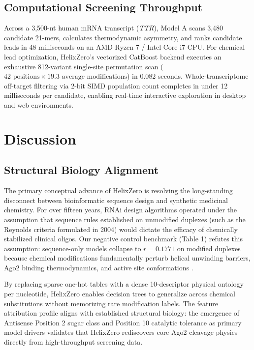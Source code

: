 \documentclass[twocolumn]{article}
\begin{document}
\subsection{Computational Screening Throughput}
Across a 3,500-nt human mRNA transcript (\textit{TTR}), Model A scans 3,480 candidate 21-mers, calculates thermodynamic asymmetry, and ranks candidate leads in 48 milliseconds on an AMD Ryzen 7 / Intel Core i7 CPU. For chemical lead optimization, HelixZero's vectorized CatBoost backend executes an exhaustive 812-variant single-site permutation scan ($42 \text{ positions} \times 19.3 \text{ average modifications}$) in 0.082 seconds. Whole-transcriptome off-target filtering via 2-bit SIMD population count completes in under 12 milliseconds per candidate, enabling real-time interactive exploration in desktop and web environments.

\section{Discussion}

\subsection{Structural Biology Alignment}
The primary conceptual advance of HelixZero is resolving the long-standing disconnect between bioinformatic sequence design and synthetic medicinal chemistry. For over fifteen years, RNAi design algorithms operated under the assumption that sequence rules established on unmodified duplexes (such as the Reynolds criteria formulated in 2004) would dictate the efficacy of chemically stabilized clinical oligos. Our negative control benchmark (Table 1) refutes this assumption: sequence-only models collapse to $r = 0.1771$ on modified duplexes because chemical modifications fundamentally perturb helical unwinding barriers, Ago2 binding thermodynamics, and active site conformations \cite{uppuladinne2019jbsd}.

By replacing sparse one-hot tables with a dense 10-descriptor physical ontology per nucleotide, HelixZero enables decision trees to generalize across chemical substitutions without memorizing rare modification labels. The feature attribution profile aligns with established structural biology: the emergence of Antisense Position 2 sugar class and Position 10 catalytic tolerance as primary model drivers validates that HelixZero rediscovers core Ago2 cleavage physics directly from high-throughput screening data.
\end{document}
